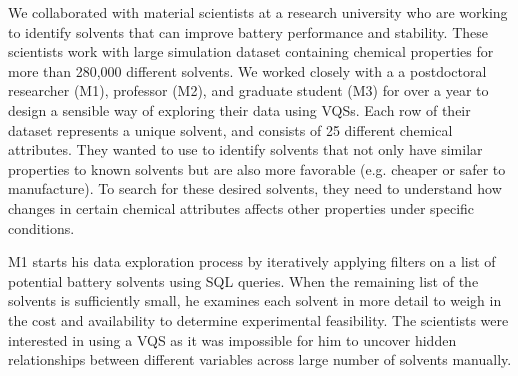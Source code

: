 \par\noindent{} We collaborated with material scientists at a research university who are working to identify solvents that can improve battery performance and stability. These scientists work with large simulation dataset containing chemical properties for more than 280,000 different solvents. We worked closely with a a postdoctoral researcher (M1), professor (M2), and graduate student (M3) for over a year to design a sensible way of exploring their data using VQSs. Each row of their dataset represents a unique solvent, and consists of 25 different chemical attributes. They wanted to use \zv to identify solvents that not only have similar properties to known solvents but are also more favorable (e.g. cheaper or safer to manufacture). To search for these desired solvents, they need to understand how changes in certain chemical attributes affects other properties under specific conditions.
\par M1 starts his data exploration process by iteratively applying filters on a list of potential battery solvents using SQL queries. When the remaining list of the solvents is sufficiently small, he examines each solvent in more detail to weigh in the cost and availability to determine experimental feasibility. The scientists were interested in using a VQS as it was impossible for him to uncover hidden relationships between different variables across large number of solvents manually.%